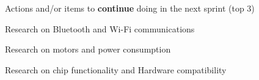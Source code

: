 \documentclass{article}
\begin{document}
Actions and/or items to \textbf{continue} doing in the next sprint (top 3)
\begin{itemize}
\begin{item}
Research on Bluetooth and Wi-Fi communications
\end{item}
\begin{item}
Research on motors and power consumption
\end{item}
\begin{item}
Research on chip functionality and Hardware compatibility
\end{item}
\end{itemize}
\end{document}
